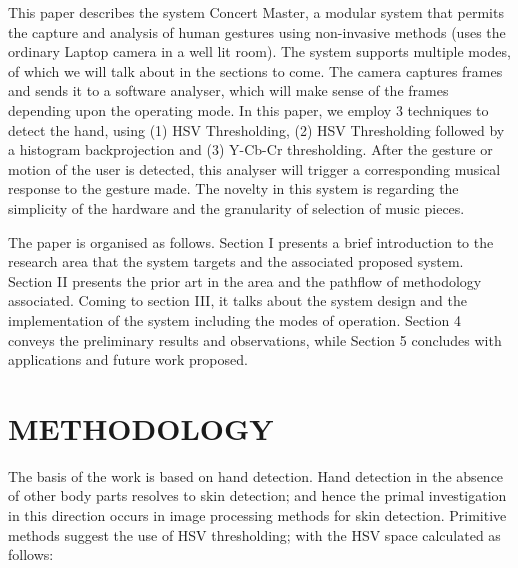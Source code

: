 \documentclass[letterpaper, 11 pt, twoside, conference]{ieeeconf}
\begin{document}
This paper describes the system Concert Master, a modular system that permits the capture and analysis of human gestures using non-invasive methods (uses the ordinary Laptop camera in a well lit room).
The system supports multiple modes, of which we will talk about in the sections to come. The camera
captures frames and sends it to a software analyser, which will make sense of the frames depending
upon the operating mode. In this paper, we employ 3 techniques to detect the hand, using (1) HSV Thresholding,
(2) HSV Thresholding followed by a histogram backprojection and (3) Y-Cb-Cr thresholding. After the gesture or motion of the user is detected, this analyser will
trigger a corresponding musical response to the gesture made. The novelty in this system is regarding the
simplicity of the hardware and the granularity of selection of music pieces.

The paper is organised as follows. Section I presents a brief introduction to the research area that the system targets and
the associated proposed system. Section II presents the prior art in the area and the
pathflow of methodology associated. Coming to section III, it talks about the system design
and the implementation of the system including the modes of operation. Section 4 conveys the
preliminary results and observations, while Section 5 concludes with applications and future
work proposed.

\section{METHODOLOGY}
\label{sec:pagestyle}

The basis of the work is based on hand detection. Hand detection in the absence of
other body parts resolves to skin detection; and hence the primal investigation in this
direction occurs in image processing methods for skin detection. Primitive methods
suggest the use of HSV thresholding; with the HSV space calculated as follows:
\end{document}
